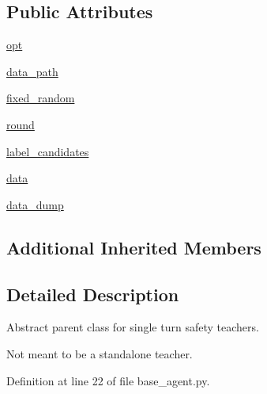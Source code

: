 \subsection*{Public Attributes}
\begin{DoxyCompactItemize}
\item 
\hyperlink{classparlai_1_1tasks_1_1dialogue__safety_1_1base__agent_1_1__BaseSafetyTeacher_a72d5420bf860ece2469f704aff6a4741}{opt}
\item 
\hyperlink{classparlai_1_1tasks_1_1dialogue__safety_1_1base__agent_1_1__BaseSafetyTeacher_acc01c5943e88188386156bee04df64cd}{data\+\_\+path}
\item 
\hyperlink{classparlai_1_1tasks_1_1dialogue__safety_1_1base__agent_1_1__BaseSafetyTeacher_ac288768013bb6f6eae5b6d54e6038c97}{fixed\+\_\+random}
\item 
\hyperlink{classparlai_1_1tasks_1_1dialogue__safety_1_1base__agent_1_1__BaseSafetyTeacher_a3de49870b976f3f356d43d18bdee3206}{round}
\item 
\hyperlink{classparlai_1_1tasks_1_1dialogue__safety_1_1base__agent_1_1__BaseSafetyTeacher_a5f12c3a58104bcbe47d921c5fc74f571}{label\+\_\+candidates}
\item 
\hyperlink{classparlai_1_1tasks_1_1dialogue__safety_1_1base__agent_1_1__BaseSafetyTeacher_aa6fcadfe3658452b2ec1d1ab7fba050e}{data}
\item 
\hyperlink{classparlai_1_1tasks_1_1dialogue__safety_1_1base__agent_1_1__BaseSafetyTeacher_aa689aab73ec3cfd0047bb8ec694893b3}{data\+\_\+dump}
\end{DoxyCompactItemize}
\subsection*{Additional Inherited Members}


\subsection{Detailed Description}
\begin{DoxyVerb}Abstract parent class for single turn safety teachers.

Not meant to be a standalone teacher.
\end{DoxyVerb}
 

Definition at line 22 of file base\+\_\+agent.\+py.



